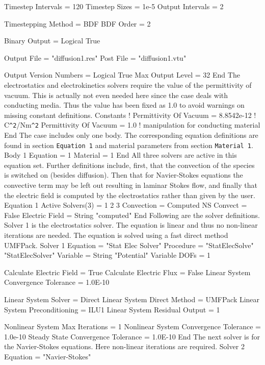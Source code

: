   Timestep Intervals = 120
  Timestep Sizes = 1e-5  
  Output Intervals = 2

  Timestepping Method = BDF
  BDF Order = 2

  Binary Output = Logical True

  Output File = "diffusion1.res"
  Post File = "diffusion1.vtu"

  Output Version Numbers = Logical True
  Max Output Level = 32
End
\ttend
%
The electrostatics and electrokinetics solvers require the value of
the permittivity of vacuum. This is actually not even needed here
since the case deals with conducting media. Thus the value has been
fixed as 1.0 to avoid warnings on missing constant definitions.
%
\ttbegin
Constants
!  Permittivity Of Vacuum = 8.8542e-12  ! C\verb|^2|/Nm\verb*|^2|
  Permittivity Of Vacuum = 1.0 ! manipulation for conducting material
End
\ttend
%
The case includes only one body. The corresponding equation definitions are
found in section \texttt{Equation 1} and material parameters from
section \texttt{Material 1}.
%
\ttbegin
Body 1
  Equation = 1
  Material = 1
End
\ttend
%
All three solvers are active in this equation set. Further definitions
include, first, that the convection of the species is switched on
(besides diffusion). Then that for Navier-Stokes equations the
convective term may be left out resulting in laminar Stokes flow, and
finally that the electric field is computed by the electrostatics
rather than given by the user.
%
\ttbegin
Equation 1
  Active Solvers(3) = 1 2 3
  Convection = Computed
  NS Convect = False
  Electric Field = String "computed"
End
\ttend
%
Following are the solver definitions. Solver 1 is the electrostatics
solver. The equation is linear and thus no non-linear iterations are
needed. The equation is solved using a fast direct method UMFPack.
%
\ttbegin
Solver 1  
  Equation = "Stat Elec Solver"
  Procedure = "StatElecSolve" "StatElecSolver"
  Variable = String "Potential"
  Variable DOFs = 1

  Calculate Electric Field = True
  Calculate Electric Flux = False
  Linear System Convergence Tolerance = 1.0E-10

  Linear System Solver = Direct
  Linear System Direct Method = UMFPack 
  Linear System Preconditioning = ILU1
  Linear System Residual Output = 1

  Nonlinear System Max Iterations = 1
  Nonlinear System Convergence Tolerance = 1.0e-10
  Steady State Convergence Tolerance =  1.0E-10
End
\ttend
%
The next solver is for the Navier-Stokes equations. Here non-linear
iterations are required.
\ttbegin
Solver 2
  Equation = "Navier-Stokes"

